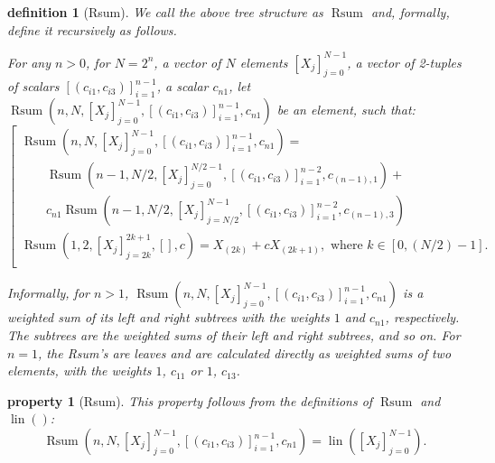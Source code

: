 \documentclass{mathcryptology} %
\DeclareMathOperator{\lin}{lin}
\DeclareMathOperator{\Rsum}{Rsum}
\theoremstyle{title}
\newtheorem*{titledefinition}{definition}
\newtheorem*{titleproperty}{property}
\theoremstyle{titleof}
\begin{document}
    \begin{titledefinition}[Rsum]
        We call the above tree structure as $\Rsum$ and, formally, define it recursively as follows.

        For any $n>0$, for $N=2^{n}$, a vector of $N$ elements ${\left[X_{j}\right]}_{j=0}^{N-1}$, a vector of 2-tuples of scalars ${\left[ \left(c_{i1}, c_{i3}\right)\right]}_{i=1}^{n-1}$, a scalar $c_{n1}$, let $\Rsum\left(n, N, {\left[X_{j}\right]}_{j=0}^{N-1}, {\left[\left(c_{i1}, c_{i3}\right)\right]}_{i=1}^{n-1}, c_{n1}\right)$ be an element, such that:
        \begin{equation*}
            \left[
                \begin{array}{l}
                \Rsum\left(n, N,
                {\left[X_{j}\right]}_{j=0}^{N-1},
                {\left[\left(c_{i1}, c_{i3}\right)\right]}_{i=1}^{n-1},
                c_{n1}\right) =\\
                \qquad \Rsum\left(n-1, N/2,
                {\left[X_{j}\right]}_{j=0}^{N/2-1},
                {\left[\left(c_{i1}, c_{i3}\right)\right]}_{i=1}^{n-2},
                c_{\left(n-1\right),1}\right) +\\
                \qquad c_{n1} \Rsum\left(n-1, N/2,
                {\left[X_{j}\right]}_{j=N/2}^{N-1},
                {\left[\left(c_{i1}, c_{i3}\right)\right]}_{i=1}^{n-2},
                c_{\left(n-1\right),3}\right)\\
                \Rsum\left(1, 2,
                {\left[X_{j}\right]}_{j=2k}^{2k+1}, [],
                c\right) =
                X_{\left(2k\right)} +
                c X_{\left(2k+1\right)},
                \text{ where } k\in\left[0,\left(N/2\right)-1\right].\\
                \end{array}
            \right.
        \end{equation*}
        
        Informally, for $n>1$, $\Rsum\left(n, N, {\left[X_{j}\right]}_{j=0}^{N-1}, {\left[\left(c_{i1}, c_{i3}\right)\right]}_{i=1}^{n-1}, c_{n1}\right)$ is a weighted sum of its left and right subtrees with the weights $1$ and $c_{n1}$, respectively. The subtrees are the weighted sums of their left and right subtrees, and so on. For $n=1$, the Rsum's are leaves and are calculated directly as weighted sums of two elements, with the weights $1$, $c_{11}$ or $1$, $c_{13}$.
    \end{titledefinition}

    \begin{titleproperty}[Rsum]
        This property follows from the definitions of $\Rsum$ and $\lin()$:
        \begin{equation*}
            \Rsum\left(n, N,
            {\left[X_{j}\right]}_{j=0}^{N-1},
            {\left[\left(c_{i1}, c_{i3}\right)\right]}_{i=1}^{n-1},
            c_{n1}\right) =
            \lin\left({\left[ X_{j}\right]}_{j=0}^{N-1}\right).
        \end{equation*}
    \end{titleproperty}
\end{document}
